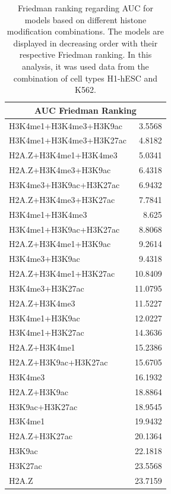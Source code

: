 \documentclass{bioinfo}
\begin{document}
\begin{table}[t]
\vspace{0.0cm}
\begin{center}
\caption{Friedman ranking regarding AUC for models based on different histone modification combinations. The models are displayed in decreasing order with their respective Friedman ranking. {\color{black} In this analysis, it was used data from the combination of cell types H1-hESC and K562.}}
\label{tab:signaltype.friedman}
\renewcommand{\arraystretch}{1.2}
  \begin{tabular}{ |lr| }
    \hline
    \multicolumn{2}{|c|}{\textbf{AUC Friedman Ranking}} \\
    \hline
    H3K4me1+H3K4me3+H3K9ac & 3.5568 \\
    H3K4me1+H3K4me3+H3K27ac & 4.8182 \\
    H2A.Z+H3K4me1+H3K4me3 & 5.0341 \\
    H2A.Z+H3K4me3+H3K9ac & 6.4318 \\
    H3K4me3+H3K9ac+H3K27ac & 6.9432 \\
    H2A.Z+H3K4me3+H3K27ac & 7.7841 \\
    H3K4me1+H3K4me3 & 8.625 \\
    H3K4me1+H3K9ac+H3K27ac & 8.8068 \\
    H2A.Z+H3K4me1+H3K9ac & 9.2614 \\
    H3K4me3+H3K9ac & 9.4318 \\
    H2A.Z+H3K4me1+H3K27ac & 10.8409 \\
    H3K4me3+H3K27ac & 11.0795 \\
    H2A.Z+H3K4me3 & 11.5227 \\
    H3K4me1+H3K9ac & 12.0227 \\
    H3K4me1+H3K27ac & 14.3636 \\
    H2A.Z+H3K4me1 & 15.2386 \\
    H2A.Z+H3K9ac+H3K27ac & 15.6705 \\
    H3K4me3 & 16.1932 \\
    H2A.Z+H3K9ac & 18.8864 \\
    H3K9ac+H3K27ac & 18.9545 \\
    H3K4me1 & 19.9432 \\
    H2A.Z+H3K27ac & 20.1364 \\
    H3K9ac & 22.1818 \\
    H3K27ac & 23.5568 \\
    H2A.Z & 23.7159 \\
    \hline
  \end{tabular}
\end{center}
\vspace{0.0cm}
\end{table}
\end{document}
